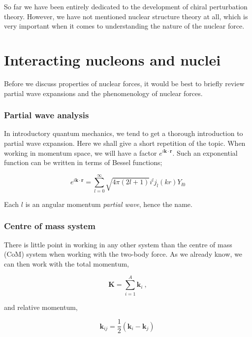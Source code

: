 \documentclass[10pt,twoside]{report}
\begin{document}
	So far we have been entirely dedicated to the development of chiral perturbation theory. However, we have not mentioned nuclear structure theory at all, which is very important when it comes to understanding the nature of the nuclear force.  %
	
	\section{Interacting nucleons and nuclei}
	Before we discuss properties of nuclear forces, it would be best to briefly review partial wave expansions and the phenomenology of nuclear forces.
	
	\subsubsection{Partial wave analysis}
	In introductory quantum mechanics, we tend to get a thorough introduction to partial wave expansion. Here we shall give a short repetition of the topic. When working in momentum space, we will have a factor $e^{i\bm{k}\cdot\bm{r}}$. Such an exponential function can be written in terms of Bessel functions;
	
	\begin{equation}
		e^{i\bm{k}\cdot\bm{r}} = \sum_{l=0}^{\infty} \sqrt{4\pi(2l+1)}i^lj_l(kr)Y_{l0}
	\end{equation}
	
	Each $l$ is an angular momentum \emph{partial wave}, hence the name.
	
	\subsubsection{Centre of mass system}
	There is little point in working in any other system than the centre of mass (CoM) system when working with the two-body force. As we already know, we can then work with the total momentum,
	
	\begin{equation}
		\bm{K} = \sum_{i=1}^A \bm{k}_i\:,
	\end{equation}
	
	\noindent and relative momentum,
	
	\begin{equation}
		\bm{k}_{ij} = \frac{1}{2}(\bm{k}_i - \bm{k}_j) \:
	\end{equation}
	
\end{document}
